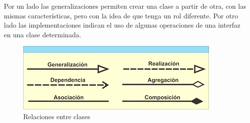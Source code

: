 Por un lado las generalizaciones permiten crear una clase a partir de otra, con las mismas características, pero con la idea de que tenga un rol diferente. Por otro lado las implementaciones indican el uso de algunas operaciones de una interfaz en una clase determinada.

\begin{figure}[h!]
	\centering
	\includegraphics[scale=0.4]{diseno/clases/imgs/relaciones}
	\caption{Relaciones entre clases}
\end{figure}
